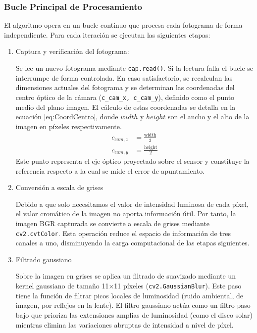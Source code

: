 \subsubsection{Bucle Principal de Procesamiento}
El algoritmo opera en un bucle continuo que procesa cada fotograma de forma independiente. Para cada iteración se ejecutan las siguientes etapas:
\begin{enumerate}
    \item Captura y verificación del fotograma:
    
    	Se lee un nuevo fotograma mediante \texttt{cap.read()}. Si la lectura falla el bucle se interrumpe de forma controlada. En caso satisfactorio, se recalculan las dimensiones actuales del fotograma y se determinan las coordenadas del centro óptico de la cámara (\texttt{c\_cam\_x, c\_cam\_y}), definido como el punto medio del plano imagen. El cálculo de estas coordenadas se detalla en la ecuación \eqref{eq:CoordCentro}, donde $width$ y $height$ son el ancho y el alto de la imagen en píxeles respectivamente.
    		\begin{equation}
    			\begin{aligned}
        			c_{cam,x} &= \frac{\text{width}}{2} \\[1ex]
        			c_{cam,y} &= \frac{\text{height}}{2}
    			\end{aligned}
  		\label{eq:CoordCentro}
		\end{equation}
	Este punto representa el eje óptico proyectado sobre el sensor y constituye la referencia respecto a la cual se mide el error de apuntamiento.
    \item Conversión a escala de grises
    
	Debido a que solo necesitamos el valor de intensidad luminosa de cada píxel, el valor cromático de la imagen no aporta información útil. Por tanto, la imagen BGR capturada se convierte a escala de grises mediante \texttt{cv2.cvtColor}. Esta operación reduce el espacio de información de tres canales a uno, disminuyendo la carga computacional de las etapas siguientes.
    
    \item Filtrado gaussiano
    
	Sobre la imagen en grises se aplica un filtrado de suavizado mediante un kernel gaussiano de tamaño 11×11 píxeles (\texttt{cv2.GaussianBlur}). Este paso tiene la función de filtrar picos locales de luminosidad (ruido ambiental, de imagen, por reflejos en la lente). El filtro gaussiano actúa como un filtro paso bajo que prioriza las extensiones amplias de luminosidad (como el disco solar) mientras elimina las variaciones abruptas de intensidad a nivel de píxel.
    

\end{enumerate}
